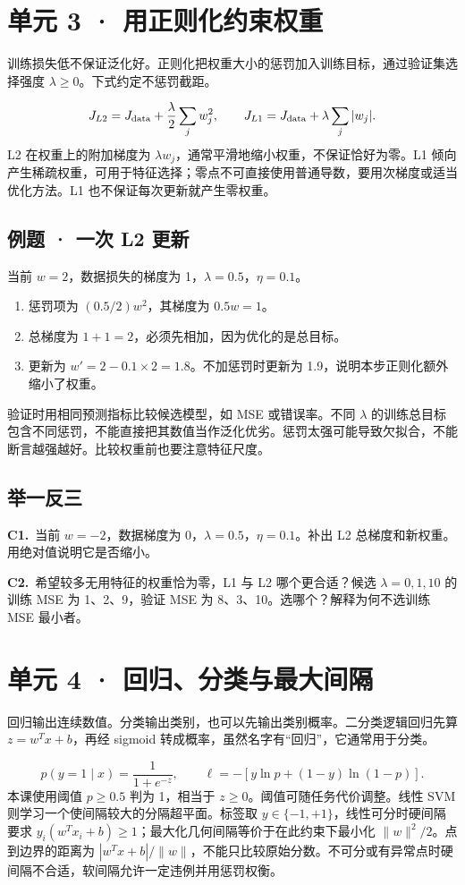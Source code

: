 \documentclass[UTF8,a4paper,11pt]{ctexart}
\newcommand{\PracticeQuestion}[3]{\par\Needspace{4\baselineskip}\noindent\begin{minipage}{\linewidth}\textbf{#1.}\ #2\par\noindent\rule{0pt}{#3mm}\par\end{minipage}\par}
\begin{document}
\section{单元 3 · 用正则化约束权重}
训练损失低不保证泛化好。正则化把权重大小的惩罚加入训练目标，通过验证集选择强度 $\lambda\geq0$。下式约定不惩罚截距。

\[J_{L2}=J_{\rm data}+\frac{\lambda}{2}\sum_j w_j^2,\qquad J_{L1}=J_{\rm data}+\lambda\sum_j|w_j|.\]
L2 在权重上的附加梯度为 $\lambda w_j$，通常平滑地缩小权重，不保证恰好为零。L1 倾向产生稀疏权重，可用于特征选择；零点不可直接使用普通导数，要用次梯度或适当优化方法。L1 也不保证每次更新就产生零权重。

\subsection{例题 · 一次 L2 更新}
当前 $w=2$，数据损失的梯度为 1，$\lambda=0.5$，$\eta=0.1$。

\begin{enumerate}
\item 惩罚项为 $(0.5/2)w^2$，其梯度为 $0.5w=1$。
\item 总梯度为 $1+1=2$，必须先相加，因为优化的是总目标。
\item 更新为 $w'=2-0.1\times2=1.8$。不加惩罚时更新为 1.9，说明本步正则化额外缩小了权重。
\end{enumerate}
验证时用相同预测指标比较候选模型，如 MSE 或错误率。不同 $\lambda$ 的训练总目标包含不同惩罚，不能直接把其数值当作泛化优劣。惩罚太强可能导致欠拟合，不能断言越强越好。比较权重前也要注意特征尺度。

\subsection{举一反三}
\PracticeQuestion{C1}{当前 $w=-2$，数据梯度为 0，$\lambda=0.5$，$\eta=0.1$。补出 L2 总梯度和新权重。用绝对值说明它是否缩小。}{27}
\PracticeQuestion{C2}{希望较多无用特征的权重恰为零，L1 与 L2 哪个更合适？候选 $\lambda=0,1,10$ 的训练 MSE 为 1、2、9，验证 MSE 为 8、3、10。选哪个？解释为何不选训练 MSE 最小者。}{35}
\clearpage
\section{单元 4 · 回归、分类与最大间隔}
回归输出连续数值。分类输出类别，也可以先输出类别概率。二分类逻辑回归先算 $z=w^Tx+b$，再经 sigmoid 转成概率，虽然名字有“回归”，它通常用于分类。

\[p(y=1\mid x)=\frac{1}{1+e^{-z}},\qquad \ell=-[y\ln p+(1-y)\ln(1-p)].\]
本课使用阈值 $p\geq0.5$ 判为 1，相当于 $z\geq0$。阈值可随任务代价调整。线性 SVM 则学习一个使间隔较大的分隔超平面。标签取 $y\in\{-1,+1\}$，线性可分时硬间隔要求 $y_i(w^Tx_i+b)\geq1$；最大化几何间隔等价于在此约束下最小化 $\|w\|^2/2$。点到边界的距离为 $|w^Tx+b|/\|w\|$，不能只比较原始分数。不可分或有异常点时硬间隔不合适，软间隔允许一定违例并用惩罚权衡。
\end{document}
